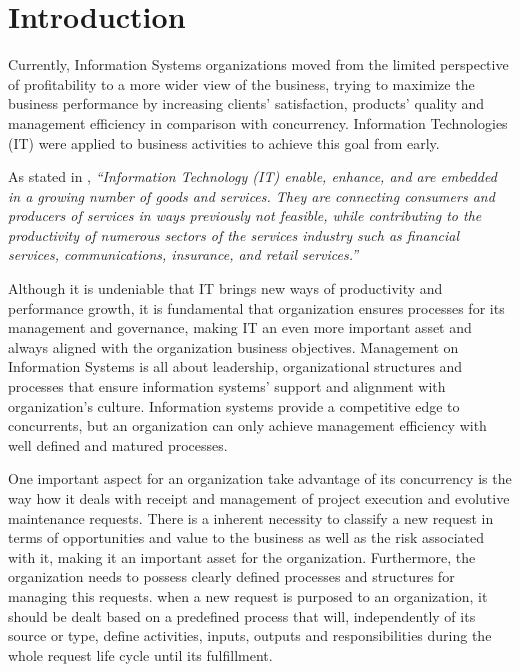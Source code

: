 
% 
% 

\section{Introduction}


Currently, Information Systems organizations moved from the limited perspective of profitability to a more wider view of the business, trying to maximize the business performance by increasing clients' satisfaction, products' quality and management efficiency in comparison with concurrency. Information Technologies (IT) were applied to business activities to achieve this goal from early.\par 
As stated in \cite{itilSS}, \textit{``Information Technology (IT) enable, enhance, and are embedded in a growing number of goods and services. They are connecting consumers and producers of services in ways previously not feasible, while contributing to the productivity of numerous sectors of the services industry such as financial services, communications, insurance, and retail services.''}\par
Although it is undeniable that IT brings new ways of productivity and performance growth, it is fundamental that organization ensures processes for its management and governance, making IT an even more important asset and always aligned with the organization business objectives. Management on Information Systems is all about leadership, organizational structures and processes that ensure information systems' support and alignment with organization's culture. Information systems provide a competitive edge to concurrents, but an organization can only achieve management efficiency with well defined and matured processes.\par
One important aspect for an organization take advantage of its concurrency is the way how it deals with receipt and management of project execution and evolutive maintenance requests. There is a inherent necessity to classify a new request in terms of opportunities  and value to the business as well as the risk associated with it, making it an important asset for the organization. Furthermore, the organization needs to possess clearly defined processes and structures for managing this requests. when a new request is purposed to an organization, it should be dealt based on a predefined process that will, independently of its source or type, define activities, inputs, outputs and responsibilities during the whole request life cycle until its fulfillment. \par
